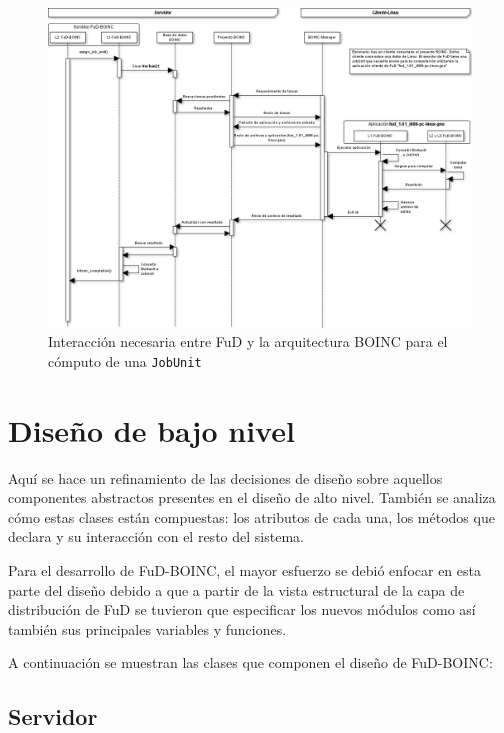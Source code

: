 \begin{landscape}
	\begin{figure}[H]
		\begin{center}
	  		\includegraphics[scale=0.41]{images/interaccion-fud-boinc.png}
			\caption{Interacción necesaria entre FuD y la arquitectura BOINC para el cómputo de una \texttt{JobUnit}}
			\label{fig:interaccion-fud-boinc}
		\end{center}
	\end{figure}
\end{landscape}


\section{Diseño de bajo nivel}

Aquí se hace un refinamiento de las decisiones de diseño sobre aquellos componentes abstractos presentes en el diseño de alto nivel. También se analiza cómo estas clases están compuestas: los atributos de cada una, los métodos que declara y su interacción con el resto del sistema.

Para el desarrollo de FuD-BOINC, el mayor esfuerzo se debió enfocar en esta parte del diseño debido a que a partir de la vista estructural de la capa de distribución de FuD se tuvieron que especificar los nuevos módulos como así también sus principales variables y funciones. 

A continuación se muestran las clases que componen el diseño de FuD-BOINC:

\subsection{Servidor}

